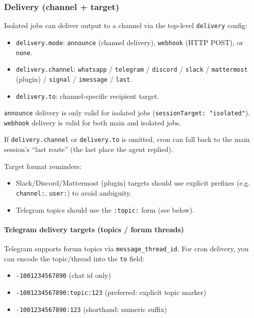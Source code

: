 \subsubsection{Delivery (channel + target)}


Isolated jobs can deliver output to a channel via the top-level \texttt{delivery} config:

\begin{itemize}
  \item \texttt{delivery.mode}: \texttt{announce} (channel delivery), \texttt{webhook} (HTTP POST), or \texttt{none}.
  \item \texttt{delivery.channel}: \texttt{whatsapp} / \texttt{telegram} / \texttt{discord} / \texttt{slack} / \texttt{mattermost} (plugin) / \texttt{signal} / \texttt{imessage} / \texttt{last}.
  \item \texttt{delivery.to}: channel-specific recipient target.
\end{itemize}


\texttt{announce} delivery is only valid for isolated jobs (\texttt{sessionTarget: "isolated"}).
\texttt{webhook} delivery is valid for both main and isolated jobs.

If \texttt{delivery.channel} or \texttt{delivery.to} is omitted, cron can fall back to the main session’s
“last route” (the last place the agent replied).

Target format reminders:

\begin{itemize}
  \item Slack/Discord/Mattermost (plugin) targets should use explicit prefixes (e.g. \texttt{channel:}, \texttt{user:}) to avoid ambiguity.
  \item Telegram topics should use the \texttt{:topic:} form (see below).
\end{itemize}


\paragraph{Telegram delivery targets (topics / forum threads)}


Telegram supports forum topics via \texttt{message\_thread\_id}. For cron delivery, you can encode
the topic/thread into the \texttt{to} field:

\begin{itemize}
  \item \texttt{-1001234567890} (chat id only)
  \item \texttt{-1001234567890:topic:123} (preferred: explicit topic marker)
  \item \texttt{-1001234567890:123} (shorthand: numeric suffix)
\end{itemize}


